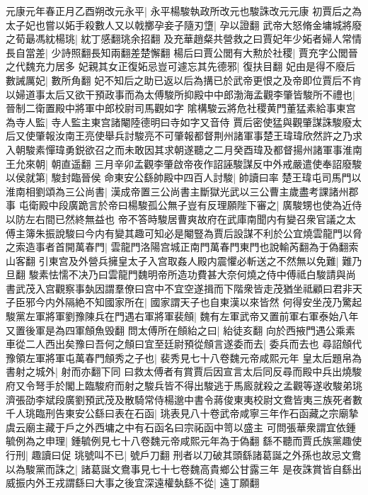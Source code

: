 元康元年春正月乙酉朔改元永平|{
	永平楊駿執政所改元也駿誅改元元康}
初賈后之為太子妃也嘗以妬手殺數人又以戟擲孕妾子隨刃墯|{
	孕以證翻}
武帝大怒脩金墉城將廢之荀朂馮紞楊珧|{
	紞丁感翻珧余招翻}
及充華趙粲共營救之曰賈妃年少妬者婦人常情長自當差|{
	少詩照翻長知兩翻差楚懈翻}
楊后曰賈公閭有大勲於社稷|{
	賈充字公閭晉之代魏充力居多}
妃親其女正復妬忌豈可遽忘其先德邪|{
	復扶目翻}
妃由是得不廢后數誡厲妃|{
	數所角翻}
妃不知后之助已返以后為搆已於武帝更恨之及帝即位賈后不肯以婦道事太后又欲干預政事而為太傅駿所抑殿中中郎渤海孟觀李肇皆駿所不禮也|{
	晉制二衛置殿中將軍中郎校尉司馬觀如字}
隂構駿云將危社稷黄門董猛素給事東宫為寺人監|{
	寺人監主東宫諸閹陸德明曰寺如字又音侍}
賈后密使猛與觀肇謀誅駿廢太后又使肇報汝南王亮使舉兵討駿亮不可肇報都督荆州諸軍事楚王瑋瑋欣然許之乃求入朝駿素憚瑋勇鋭欲召之而未敢因其求朝遂聽之二月癸酉瑋及都督揚州諸軍事淮南王允來朝|{
	朝直遥翻}
三月辛卯孟觀李肇啟帝夜作詔誣駿謀反中外戒嚴遣使奉詔廢駿以侯就第|{
	駿封臨晉侯}
命東安公繇帥殿中四百人討駿|{
	帥讀曰率}
楚王瑋屯司馬門以淮南相劉頌為三公尚書|{
	漢成帝置三公尚書主斷獄光武以三公曹主歲盡考課諸州郡事}
屯衛殿中段廣跪言於帝曰楊駿孤公無子豈有反理願陛下審之|{
	廣駿甥也使為近侍以防左右間已然終無益也}
帝不答時駿居曹爽故府在武庫南聞内有變召衆官議之太傅主簿朱振說駿曰今内有變其趣可知必是閹豎為賈后設謀不利於公宜燒雲龍門以脅之索造事者首開萬春門|{
	雲龍門洛陽宫城正南門萬春門東門也說輸芮翻為于偽翻索山客翻}
引東宫及外營兵擁皇太子入宫取姦人殿内震懼必斬送之不然無以免難|{
	難乃旦翻}
駿素怯懦不决乃曰雲龍門魏明帝所造功費甚大奈何燒之侍中傅祗白駿請與尚書武茂入宫觀察事埶因謂羣僚曰宫中不宜空遂揖而下階衆皆走茂猶坐祗顧曰君非天子臣邪今内外隔絶不知國家所在|{
	國家謂天子也自東漢以來皆然}
何得安坐茂乃驚起駿黨左軍將軍劉豫陳兵在門遇右軍將軍裴頠|{
	魏有左軍武帝又置前軍右軍泰始八年又置後軍是為四軍頠魚毁翻}
問太傅所在頠紿之曰|{
	紿徒亥翻}
向於西掖門遇公乘素車從二人西出矣豫曰吾何之頠曰宜至廷尉預從頠言遂委而去|{
	委兵而去也}
尋詔頠代豫領左軍將軍屯萬春門頠秀之子也|{
	裴秀見七十八卷魏元帝咸熙元年}
皇太后題帛為書射之城外|{
	射而亦翻下同}
曰救太傅者有賞賈后因宣言太后同反尋而殿中兵出燒駿府又令弩手於閣上臨駿府而射之駿兵皆不得出駿逃于馬廄就殺之孟觀等遂收駿弟珧濟張劭李斌段廣劉預武茂及散騎常侍楊邈中書令蔣俊東夷校尉文鴦皆夷三族死者數千人珧臨刑告東安公繇曰表在石函|{
	珧表見八十卷武帝咸寧三年作石函藏之宗廟摯虞云廟主藏于戶之外西墉之中有石函名曰宗祏函中笥以盛主}
可問張華衆謂宜依鍾毓例為之申理|{
	鍾毓例見七十八卷魏元帝咸熙元年為于偽翻}
繇不聽而賈氏族黨趣使行刑|{
	趣讀曰促}
珧號叫不已|{
	號戶刀翻}
刑者以刀破其頭繇諸葛誕之外孫也故忌文鴦以為駿黨而誅之|{
	諸葛誕文鴦事見七十七卷魏高貴鄉公甘露三年}
是夜誅賞皆自繇出威振内外王戎謂繇曰大事之後宜深遠權埶繇不從|{
	遠丁願翻}
